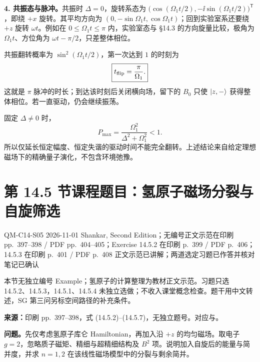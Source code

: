 \begin{checkedsolution}
\textbf{4. 共振态与脉冲。}共振时 $\Delta=0$，旋转系态为
$\bigl(\cos(\Omega_1t/2),-\ii\sin(\Omega_1t/2)\bigr)^{\mathsf T}$，即绕 $+x$ 旋转。其平均方向为 $(0,-\sin\Omega_1t,\cos\Omega_1t)$；回到实验室系还要绕 $+z$ 旋转 $\omega t$。例如在 $0\le\Omega_1t\le\pi$ 内，实验室态与 \S 14.3 的方向旋量比较，极角为 $\Omega_1t$、方位角为 $\omega t-\pi/2$，只差整体相位。

共振翻转概率为 $\sin^2(\Omega_1t/2)$，第一次达到 $1$ 的时刻为
\begin{equation}
  \boxed{t_{\rm flip}=\frac\pi{\Omega_1}.}
\end{equation}
这就是 $\pi$ 脉冲的时长；到达该时刻后关闭横向场，留下的 $B_0$ 只使 $\left|z,-\right\rangle$ 获得整体相位。若一直驱动，仍会继续振荡。

固定 $\Delta\ne0$ 时，
\begin{equation}
  \boxed{P_{\max}=\frac{\Omega_1^2}{\Delta^2+\Omega_1^2}<1.}
\end{equation}
所以仅延长恒定幅度、恒定失谐的驱动时间不能完全翻转。上述结论来自给定理想磁场下的精确量子演化，不包含环境弛豫。
\end{checkedsolution}

\section{第 14.5 节课程题目：氢原子磁场分裂与自旋筛选}
\label{exercises:QM-C14-S05}
\exercisemeta
  {QM-C14-S05}
  {2026-11-01}
  {Shankar, Second Edition；无编号正文示范在印刷 pp.~397--398 / PDF pp.~404--405；Exercise 14.5.2 在印刷 p.~399 / PDF p.~406；14.5.3 在印刷 p.~401 / PDF p.~408}
  {正文示范已讲解；两道选定习题已作答并核对}
  {笔记已确认}

本节无独立编号 Example；氢原子的计算整理为教材正文示范。习题只选 14.5.2、14.5.3，14.5.1、14.5.4 未独立选做；不收入课堂概念检查。题干用中文转述，SG 第三问另标空间路径的补充条件。

\textbf{来源：}印刷 pp.~397--398，式 (14.5.2)--(14.5.7)，无独立题号。对应与。

\textbf{问题。}先仅考虑氢原子库仑 Hamiltonian，再加入沿 $+z$ 的均匀磁场。取电子 $g=2$，忽略质子磁矩、精细与超精细结构及 $B^2$ 项。说明加入自旋后的能量与简并度，并求 $n=1,2$ 在该线性磁场模型中的分裂与剩余简并。

